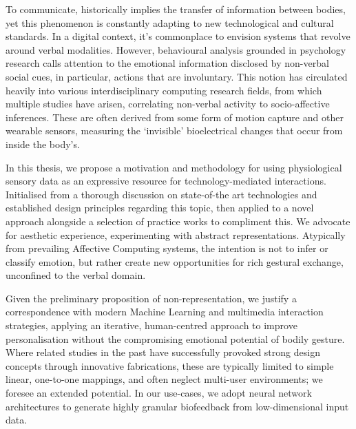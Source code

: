 To communicate, historically implies the transfer of information between bodies, yet this phenomenon is constantly adapting to new technological and cultural standards. In a digital context, it’s commonplace to envision systems that revolve around verbal modalities. However, behavioural analysis grounded in psychology research calls attention to the emotional information disclosed by non-verbal social cues, in particular, actions that are involuntary. This notion has circulated heavily into various interdisciplinary computing research fields, from which multiple studies have arisen, correlating non-verbal activity to socio-affective inferences. These are often derived from some form of motion capture and other wearable sensors, measuring the ‘invisible’ bioelectrical changes that occur from inside the body's. 

In this thesis, we propose a motivation and methodology for using physiological sensory data as an expressive resource for technology-mediated interactions. Initialised from a thorough discussion on state-of-the art technologies and established design principles regarding this topic, then applied to a novel approach alongside a selection of practice works to compliment this. We advocate for aesthetic experience, experimenting with abstract representations. Atypically from prevailing Affective Computing systems, the intention is not to infer or classify emotion, but rather create new opportunities for rich gestural exchange, unconfined to the verbal domain. 

Given the preliminary proposition of non-representation, we justify a correspondence with modern Machine Learning and multimedia interaction strategies, applying an iterative, human-centred approach to improve personalisation without the compromising emotional potential of bodily gesture. Where related studies in the past have successfully provoked strong design concepts through innovative fabrications, these are typically limited to simple linear, one-to-one mappings, and often neglect multi-user environments; we foresee an extended potential. In our use-cases, we adopt neural network architectures to generate highly granular biofeedback from low-dimensional input data.

